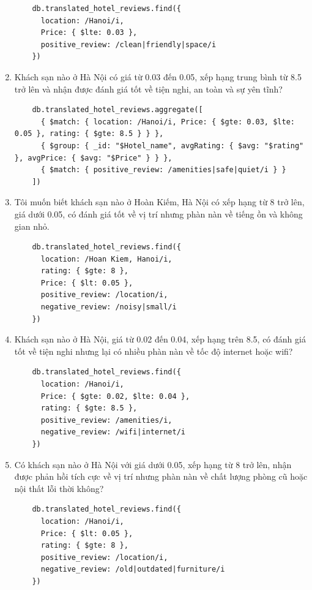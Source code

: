 \begin{enumerate}
    \begin{verbatim}
    db.translated_hotel_reviews.find({
      location: /Hanoi/i,
      Price: { $lte: 0.03 },
      positive_review: /clean|friendly|space/i
    })
    \end{verbatim}

    \item Khách sạn nào ở Hà Nội có giá từ 0.03 đến 0.05, xếp hạng trung bình từ 8.5 trở lên và nhận được đánh giá tốt về tiện nghi, an toàn và sự yên tĩnh?

    \begin{verbatim}
    db.translated_hotel_reviews.aggregate([
      { $match: { location: /Hanoi/i, Price: { $gte: 0.03, $lte: 0.05 }, rating: { $gte: 8.5 } } },
      { $group: { _id: "$Hotel_name", avgRating: { $avg: "$rating" }, avgPrice: { $avg: "$Price" } } },
      { $match: { positive_review: /amenities|safe|quiet/i } }
    ])
    \end{verbatim}

    \item Tôi muốn biết khách sạn nào ở Hoàn Kiếm, Hà Nội có xếp hạng từ 8 trở lên, giá dưới 0.05, có đánh giá tốt về vị trí nhưng phàn nàn về tiếng ồn và không gian nhỏ.

    \begin{verbatim}
    db.translated_hotel_reviews.find({
      location: /Hoan Kiem, Hanoi/i,
      rating: { $gte: 8 },
      Price: { $lt: 0.05 },
      positive_review: /location/i,
      negative_review: /noisy|small/i
    })
    \end{verbatim}

    \item Khách sạn nào ở Hà Nội, giá từ 0.02 đến 0.04, xếp hạng trên 8.5, có đánh giá tốt về tiện nghi nhưng lại có nhiều phàn nàn về tốc độ internet hoặc wifi?

    \begin{verbatim}
    db.translated_hotel_reviews.find({
      location: /Hanoi/i,
      Price: { $gte: 0.02, $lte: 0.04 },
      rating: { $gte: 8.5 },
      positive_review: /amenities/i,
      negative_review: /wifi|internet/i
    })
    \end{verbatim}

    \item Có khách sạn nào ở Hà Nội với giá dưới 0.05, xếp hạng từ 8 trở lên, nhận được phản hồi tích cực về vị trí nhưng phàn nàn về chất lượng phòng cũ hoặc nội thất lỗi thời không?

    \begin{verbatim}
    db.translated_hotel_reviews.find({
      location: /Hanoi/i,
      Price: { $lt: 0.05 },
      rating: { $gte: 8 },
      positive_review: /location/i,
      negative_review: /old|outdated|furniture/i
    })
    \end{verbatim}


\end{enumerate}

